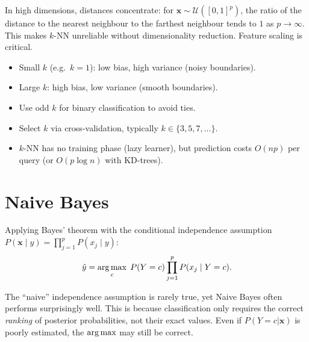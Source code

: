 \begin{warning}[title=\textbf{Curse of Dimensionality}]
In high dimensions, distances concentrate: for $\bm{x} \sim \mathcal{U}([0,1]^p)$, the ratio of the distance to the nearest neighbour to the farthest neighbour tends to $1$ as $p \to \infty$. This makes $k$-NN unreliable without dimensionality reduction. Feature scaling is critical.
\end{warning}

\begin{bestpractice}[title=\textbf{Choosing $k$}]
\begin{itemize}
    \item Small $k$ (e.g.\ $k=1$): low bias, high variance (noisy boundaries).
    \item Large $k$: high bias, low variance (smooth boundaries).
    \item Use odd $k$ for binary classification to avoid ties.
    \item Select $k$ via cross-validation, typically $k \in \{3, 5, 7, \ldots\}$.
    \item $k$-NN has no training phase (lazy learner), but prediction costs $O(np)$ per query (or $O(p\log n)$ with KD-trees).
\end{itemize}
\end{bestpractice}

\section{Naive Bayes}

\begin{definition}
Applying Bayes' theorem with the conditional independence assumption $P(\bm{x}\mid y) = \prod_{j=1}^{p} P(x_j \mid y)$:
\[
    \hat{y} = \operatorname*{arg\,max}_{c}\; P(Y=c)\prod_{j=1}^{p}P(x_j \mid Y=c).
\]
\end{definition}

\begin{remark}
The ``naive'' independence assumption is rarely true, yet Naive Bayes often performs surprisingly well. This is because classification only requires the correct \emph{ranking} of posterior probabilities, not their exact values. Even if $P(Y=c|\bm{x})$ is poorly estimated, the $\operatorname*{arg\,max}$ may still be correct.
\end{remark}

